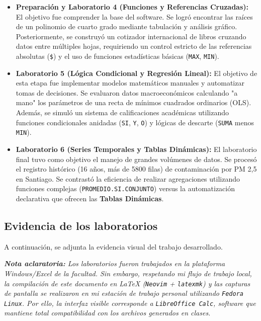 \begin{itemize}
	\item \textbf{Preparación y Laboratorio 4 (Funciones y Referencias Cruzadas):} El objetivo fue comprender la base del software. Se logró encontrar las raíces de un polinomio de cuarto grado mediante tabulación y análisis gráfico. Posteriormente, se construyó un cotizador internacional de libros cruzando datos entre múltiples hojas, requiriendo un control estricto de las referencias absolutas (\texttt{\$}) y el uso de funciones estadísticas básicas (\texttt{MAX}, \texttt{MIN}).

	\item \textbf{Laboratorio 5 (Lógica Condicional y Regresión Lineal):} El objetivo de esta etapa fue implementar modelos matemáticos manuales y automatizar tomas de decisiones. Se evaluaron datos macroeconómicos calculando "a mano" los parámetros de una recta de mínimos cuadrados ordinarios (OLS). Además, se simuló un sistema de calificaciones académicas utilizando funciones condicionales anidadas (\texttt{SI}, \texttt{Y}, \texttt{O}) y lógicas de descarte (\texttt{SUMA} menos \texttt{MIN}).

	\item \textbf{Laboratorio 6 (Series Temporales y Tablas Dinámicas):} El laboratorio final tuvo como objetivo el manejo de grandes volúmenes de datos. Se procesó el registro histórico (16 años, más de 5800 filas) de contaminación por PM 2,5 en Santiago. Se contrastó la eficiencia de realizar agregaciones utilizando funciones complejas (\texttt{PROMEDIO.SI.CONJUNTO}) versus la automatización declarativa que ofrecen las \textbf{Tablas Dinámicas}.
\end{itemize}

\subsection{Evidencia de los laboratorios}

A continuación, se adjunta la evidencia visual del trabajo desarrollado.

\vspace{0.3cm}
\noindent\textit{\textbf{Nota aclaratoria:} Los laboratorios fueron trabajados en la plataforma Windows/Excel de la facultad. Sin embargo, respetando mi flujo de trabajo local, la compilación de este documento en \LaTeX{} (\texttt{Neovim} + \texttt{latexmk}) y las capturas de pantalla se realizaron en mi estación de trabajo personal utilizando \texttt{Fedora Linux}. Por ello, la interfaz visible corresponde a \texttt{LibreOffice Calc}, software que mantiene total compatibilidad con los archivos generados en clases.}
\vspace{0.3cm}

